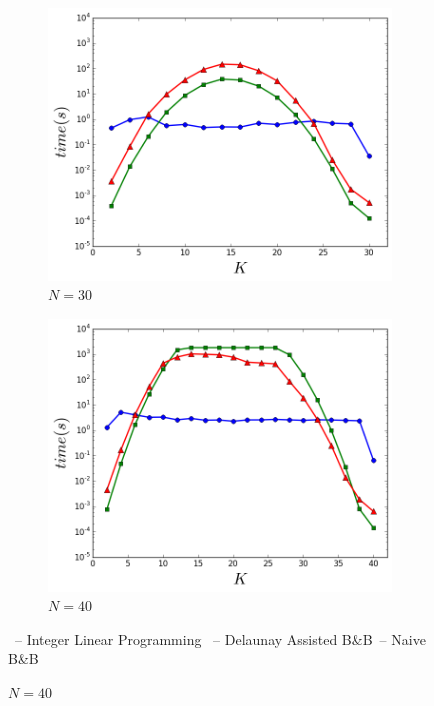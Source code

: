 \begin{figure}[t]
\begin{subfigure}[b]{0.3\linewidth}
    \includegraphics[width=0.9\linewidth]{Pictures/n30} 
    \caption{$N=30$} 
    \label{fig:fixed_n:c} 
  \end{subfigure}%
  \begin{subfigure}[b]{0.3\linewidth}
    \centering
    \includegraphics[width=0.9\linewidth]{Pictures/n40} 
    \caption{$N=40$} 
    \label{fig:fixed_n:d} 
  \end{subfigure} 
  \vspace{2ex}
  \begin{center}
  	\footnotesize
  \textcolor{blue}{\cmark}\ -- Integer Linear Programming \quad   \textcolor{red}{\tmark}\ -- Delaunay Assisted B\&B\quad \textcolor{green}{\smark}\ -- Naive B\&B
  \end{center}
\end{figure}

